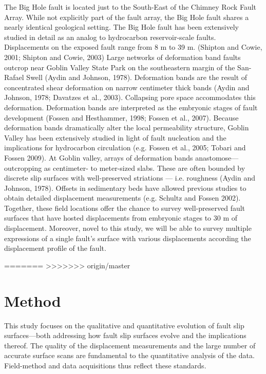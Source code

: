 \documentclass[12pt,a4paper]{article}
\begin{document}
The Big Hole fault is located just to the South-East of the Chimney Rock Fault Array. While not explicitly part of the fault array, the Big Hole fault shares a nearly identical geological setting. The Big Hole fault has been extensively studied in detail as an analog to hydrocarbon reservoir-scale faults. Displacements on the exposed fault range from 8 m to 39 m. (Shipton and Cowie, 2001; Shipton and Cowie, 2003) 
	Large networks of deformation band faults outcrop near Goblin Valley State Park on the southeastern margin of the San-Rafael Swell (Aydin and Johnson, 1978). Deformation bands are the result of concentrated shear deformation on narrow centimeter thick bands (Aydin and Johnson, 1978; Davatzes et al., 2003). Collapsing pore space accommodates this deformation. Deformation bands are interpreted as the embryonic stages of fault development (Fossen and Hesthammer, 1998; Fossen et al., 2007). Because deformation bands dramatically alter the local permeability structure, Goblin Valley has been extensively studied in light of fault nucleation and the implications for hydrocarbon circulation (e.g. Fossen et al., 2005; Tobari and Fossen 2009). At Goblin valley, arrays of deformation bands anastomose—outcropping as centimeter- to meter-sized slabs.  These are often bounded by discrete slip surfaces with well-preserved striations — i.e. roughness (Aydin and Johnson, 1978). Offsets in sedimentary beds have allowed previous studies to obtain detailed displacement measurements (e.g. Schultz and Fossen 2002). 
Together, these field locations offer the chance to survey well-preserved fault surfaces that have hosted displacements from embryonic stages to 30 m of displacement. Moreover, novel to this study, we will be able to survey multiple expressions of a single fault’s surface with various displacements according the displacement profile of the fault. 



=======
>>>>>>> origin/master
\section{Method}

This study focuses on the qualitative and quantitative evolution of fault slip surfaces—both addressing how fault slip surfaces evolve and the implications thereof. The quality of the displacement measurements and the large number of accurate surface scans are fundamental to the quantitative analysis of the data. Field-method and data acquisitions thus reflect these standards. 
\end{document}
